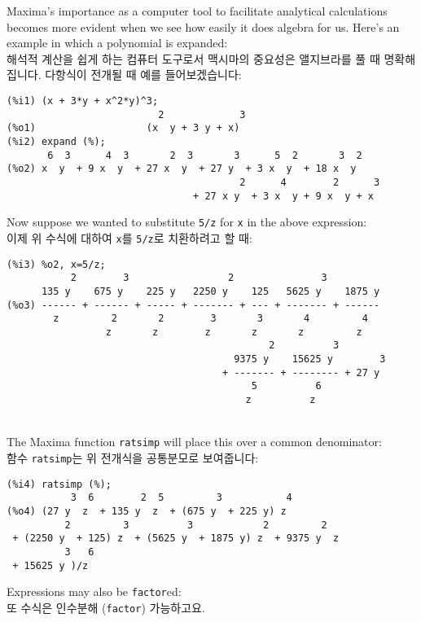 \documentclass[a4paper,12pt]{article}
\begin{document}
Maxima's importance as a computer tool to facilitate analytical 
calculations becomes more evident when we see how easily it does 
algebra for us.  Here's an example in which a polynomial is expanded: \\
해석적 계산을 쉽게 하는 컴퓨터 도구로서 맥시마의 중요성은 앨지브라를 풀 때 
 명확해집니다. 다항식이 전개될 때 예를 들어보겠습니다:
\begin{verbatim}
(%i1) (x + 3*y + x^2*y)^3;
                          2             3
(%o1)                   (x  y + 3 y + x)
(%i2) expand (%);
       6  3      4  3       2  3       3      5  2       3  2
(%o2) x  y  + 9 x  y  + 27 x  y  + 27 y  + 3 x  y  + 18 x  y
                                        2      4        2      3
                                + 27 x y  + 3 x  y + 9 x  y + x
\end{verbatim}
Now suppose we wanted to substitute {\tt 5/z} for {\tt x} in the above 
expression: \\
이제 위 수식에 대하여 {\tt x}를 {\tt 5/z}로 치환하려고 할 때: \\


\noindent\begin{minipage}{\textwidth}
\begin{verbatim}
(%i3) %o2, x=5/z;
           2        3                 2               3
      135 y    675 y    225 y   2250 y    125   5625 y    1875 y
(%o3) ------ + ------ + ----- + ------- + --- + ------- + ------
        z         2       2        3       3       4         4
                 z       z        z       z       z         z
                                             2          3
                                       9375 y    15625 y        3
                                     + ------- + -------- + 27 y
                                          5          6
                                         z          z
\end{verbatim}
\end{minipage} \\

The Maxima function {\tt ratsimp} will place this over a common denominator: \\
 함수 {\tt ratsimp}는 위 전개식을 공통분모로 보여줍니다: \\
\begin{verbatim}
(%i4) ratsimp (%);
           3  6        2  5         3           4
(%o4) (27 y  z  + 135 y  z  + (675 y  + 225 y) z
          2         3          3            2         2
 + (2250 y  + 125) z  + (5625 y  + 1875 y) z  + 9375 y  z
          3   6
 + 15625 y )/z
\end{verbatim}
Expressions may also be {\tt factor}ed: \\
또 수식은 인수분해 ({\tt factor}) 가능하고요.
\end{document}
